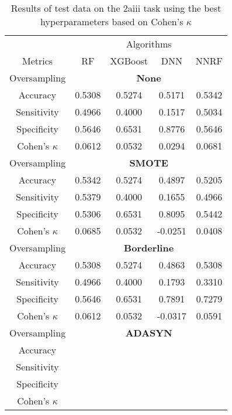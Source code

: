 \begin{table}[!htb]
\centering
\caption{Results of test data on the 2aiii task using the best hyperparameters based on Cohen's $\kappa$}
\label{tab:2aiii_test_results}
\begin{tabular}{c | c c c c}
\hline
 & \multicolumn{4}{c}{Algorithms}\\ 
Metrics &RF & XGBoost & DNN & NNRF\\ 
\hline
Oversampling &\multicolumn{4}{|c}{\textbf{None}}\\ 
\hline
Accuracy & 0.5308 & 0.5274 & 0.5171 & 0.5342\\ 
Sensitivity & 0.4966 & 0.4000 & 0.1517 & 0.5034\\ 
Specificity & 0.5646 & 0.6531 & 0.8776 & 0.5646\\ 
Cohen's $\kappa$ & 0.0612 & 0.0532 & 0.0294 & 0.0681\\ 
\hline
Oversampling &\multicolumn{4}{|c}{\textbf{SMOTE}}\\ 
\hline
Accuracy & 0.5342 & 0.5274 & 0.4897 & 0.5205\\ 
Sensitivity & 0.5379 & 0.4000 & 0.1655 & 0.4966\\ 
Specificity & 0.5306 & 0.6531 & 0.8095 & 0.5442\\ 
Cohen's $\kappa$ & 0.0685 & 0.0532 & -0.0251 & 0.0408\\ 
\hline
Oversampling &\multicolumn{4}{|c}{\textbf{Borderline}}\\ 
\hline
Accuracy & 0.5308 & 0.5274 & 0.4863 & 0.5308\\ 
Sensitivity & 0.4966 & 0.4000 & 0.1793 & 0.3310\\ 
Specificity & 0.5646 & 0.6531 & 0.7891 & 0.7279\\ 
Cohen's $\kappa$ & 0.0612 & 0.0532 & -0.0317 & 0.0591\\ 
\hline
Oversampling &\multicolumn{4}{|c}{\textbf{ADASYN}}\\ 
\hline
Accuracy &  &  &  & \\ 
Sensitivity &  &  &  & \\ 
Specificity &  &  &  & \\ 
Cohen's $\kappa$ &  &  &  & \\ 
\hline
\end{tabular}
\end{table}


